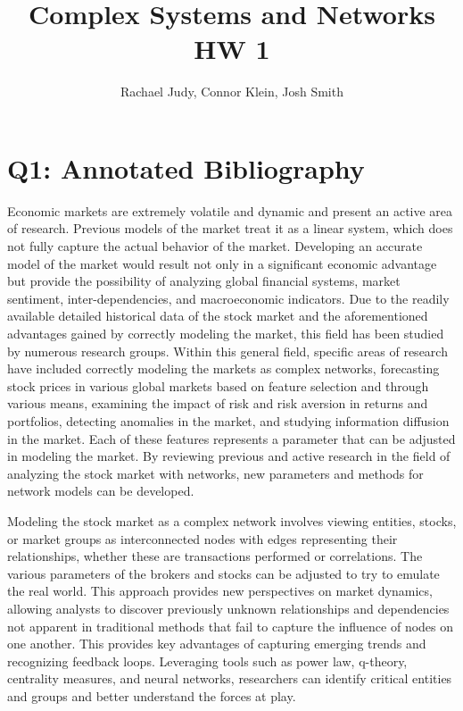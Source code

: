 \documentclass[12pt]{article}
\title{Complex Systems and Networks HW 1}
\author{Rachael Judy, Connor Klein, Josh Smith}
\begin{document}
\pgfplotsset{compat=1.18}
 
\maketitle

\section{Q1: Annotated Bibliography}

Economic markets are extremely volatile and dynamic and present an active area of research. Previous models of the market treat it as a linear system, which does not fully capture the actual behavior of the market. Developing an accurate model of the market would result not only in a significant economic advantage but provide the possibility of analyzing global financial systems, market sentiment, inter-dependencies, and macroeconomic indicators. Due to the readily available detailed historical data of the stock market and the aforementioned advantages gained by correctly modeling the market, this field has been studied by numerous research groups. Within this general field, specific areas of research have included correctly modeling the markets as complex networks, forecasting stock prices in various global markets based on feature selection and through various means, examining the impact of risk and risk aversion in returns and portfolios, detecting anomalies in the market, and studying information diffusion in the market. Each of these features represents a parameter that can be adjusted in modeling the market. By reviewing previous and active research in the field of analyzing the stock market with networks, new parameters and methods for network models can be developed.

Modeling the stock market as a complex network involves viewing entities, stocks, or market groups as interconnected nodes with edges representing their relationships, whether these are transactions performed or correlations. The various parameters of the brokers and stocks can be adjusted to try to emulate the real world. This approach provides new perspectives on market dynamics, allowing analysts to discover previously unknown relationships and dependencies not apparent in traditional methods that fail to capture the influence of nodes on one another. This provides key advantages of capturing emerging trends and recognizing feedback loops. Leveraging tools such as power law, q-theory, centrality measures, and neural networks, researchers can identify critical entities and groups and better understand the forces at play.
\end{document}
